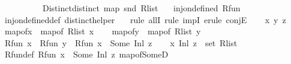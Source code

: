\begin{isabellebody}
\ \ \ \ \ \ \ \ \ \ Distinct{\isacharcolon}{\kern0pt}{\isachardoublequoteopen}distinct\ {\isacharparenleft}{\kern0pt}map\ snd\ R{\isacharunderscore}{\kern0pt}list{\isacharparenright}{\kern0pt}{\isachardoublequoteclose}\isanewline
\ \ \ {\isachardoublequoteopen}inj{\isacharunderscore}{\kern0pt}on{\isacharunderscore}{\kern0pt}defined\ R{\isacharunderscore}{\kern0pt}fun{\isachardoublequoteclose}\isanewline
%
\isadelimproof
\ \ %
\endisadelimproof
%
\isatagproof
{}\isamarkupfalse%
\ inj{\isacharunderscore}{\kern0pt}on{\isacharunderscore}{\kern0pt}defined{\isacharunderscore}{\kern0pt}def\ distinct{\isacharunderscore}{\kern0pt}helper\ \ \isanewline
{}\isamarkupfalse%
\ {\isacharparenleft}{\kern0pt}{\isacharparenleft}{\kern0pt}rule\ allI{\isacharparenright}{\kern0pt}{\isacharplus}{\kern0pt}{\isacharcomma}{\kern0pt}\ rule\ impI{\isacharcomma}{\kern0pt}\ erule\ conjE{\isacharparenright}{\kern0pt}\isanewline
\ \ \isamarkupfalse%
\ x\ y\ z\isanewline
\ \ \isamarkupfalse%
\ {\isacharquery}{\kern0pt}map{\isacharunderscore}{\kern0pt}of{\isacharunderscore}{\kern0pt}x\ {\isacharequal}{\kern0pt}\ {\isachardoublequoteopen}map{\isacharunderscore}{\kern0pt}of\ R{\isacharunderscore}{\kern0pt}list\ x{\isachardoublequoteclose}\isanewline
\ \ \isamarkupfalse%
\ {\isacharquery}{\kern0pt}map{\isacharunderscore}{\kern0pt}of{\isacharunderscore}{\kern0pt}y\ {\isacharequal}{\kern0pt}\ {\isachardoublequoteopen}map{\isacharunderscore}{\kern0pt}of\ R{\isacharunderscore}{\kern0pt}list\ y{\isachardoublequoteclose}\isanewline
\ \ \isamarkupfalse%
\ {\isachardoublequoteopen}R{\isacharunderscore}{\kern0pt}fun\ x\ {\isacharequal}{\kern0pt}\ R{\isacharunderscore}{\kern0pt}fun\ y{\isachardoublequoteclose}\ \ {\isachardoublequoteopen}R{\isacharunderscore}{\kern0pt}fun\ x\ {\isacharequal}{\kern0pt}\ Some\ {\isacharparenleft}{\kern0pt}Inl\ z{\isacharparenright}{\kern0pt}{\isachardoublequoteclose}\isanewline
\ \ \isamarkupfalse%
\ {\isachardoublequoteopen}{\isacharparenleft}{\kern0pt}x{\isacharcomma}{\kern0pt}\ Inl\ z{\isacharparenright}{\kern0pt}\ {\isasymin}\ set\ R{\isacharunderscore}{\kern0pt}list{\isachardoublequoteclose}\isanewline
\ \ \ \ \isamarkupfalse%
\ R{\isacharunderscore}{\kern0pt}fun{\isacharunderscore}{\kern0pt}def\ {\isacartoucheopen}R{\isacharunderscore}{\kern0pt}fun\ x\ {\isacharequal}{\kern0pt}\ Some\ {\isacharparenleft}{\kern0pt}Inl\ z{\isacharparenright}{\kern0pt}{\isacartoucheclose}\ map{\isacharunderscore}{\kern0pt}of{\isacharunderscore}{\kern0pt}SomeD\ \isamarkupfalse%

\end{isabellebody}

